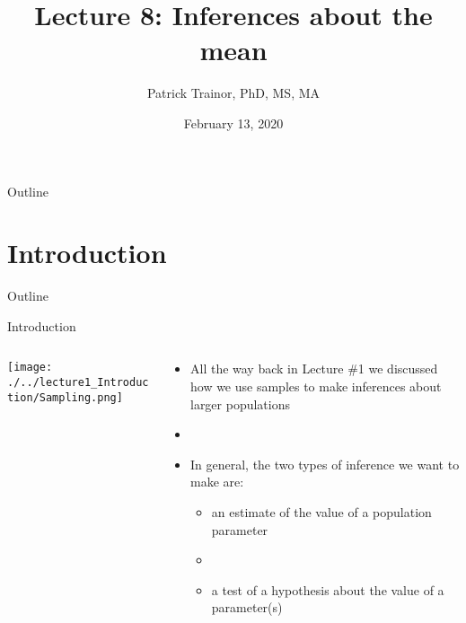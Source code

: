 \documentclass[xcolor=dvipsnames]{beamer}
\title[Lecture 8]{Lecture 8: Inferences about the mean}
\author[Patrick Trainor]{Patrick Trainor, PhD, MS, MA}
\institute[NMSU]{New Mexico State University}
\date{February 13, 2020}
\begin{document}
\begin{frame}
	\maketitle
\end{frame}

\begin{frame}{Outline}
	\tableofcontents[hideallsubsections]
\end{frame}

\section{Introduction}
\begin{frame}{Outline}
	\tableofcontents[currentsection,subsectionstyle=show/shaded/hide]
\end{frame}

\begin{frame}{Introduction}
	\begin{columns}
		\begin{column}{.4 \textwidth}
			\begin{center}
				\texttt{[image: ./../lecture1\_Introduction/Sampling.png]}
				\end{center}
		\end{column}
		\begin{column}{.5 \textwidth}
				\begin{itemize}
				\item All the way back in Lecture \#1 we discussed how we use samples to make inferences about larger populations \pause
				\item[]
				\item In general, the two types of inference we want to make are: \pause
				\begin{itemize}
					\item an estimate of the value of a population parameter \pause
					\item[]
					\item a test of a hypothesis about the value of a parameter(s)
				\end{itemize}
			\end{itemize}
		\end{column}
	\end{columns}
\end{frame}
\end{document}
